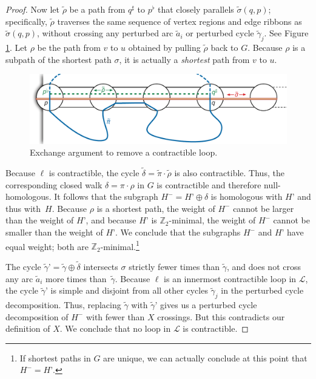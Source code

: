 \documentclass[letterpaper,review]{siamart190516}
\def\Z{\mathbb{Z}}
\begin{document}
\begin{proof}
Now let $\tilde\rho$ be a path from $q^\sharp$ to $p^\flat$ that closely parallels $\tilde\sigma(q,p)$; specifically, $\tilde\rho$ traverses the same sequence of vertex regions and edge ribbons as $\tilde\sigma(q,p)$, without crossing any perturbed arc $\tilde{a}_i$ or perturbed cycle $\tilde\gamma_j$.  See Figure \ref{F:contractible-exchange}.  Let $\rho$ be the path from $v$ to $u$ obtained by pulling $\tilde\rho$ back to $G$.  Because $\rho$ is a subpath of the shortest path $\sigma$, it is actually a \emph{shortest} path from $v$ to $u$.

\begin{figure}[ht]
\centering
\includegraphics[scale=0.4]{Fig/contractible-exchange}
\caption{Exchange argument to remove a contractible loop.}
\label{F:contractible-exchange}
\end{figure}

Because $\ell$ is contractible, the cycle $\tilde\delta = \tilde\pi\cdot\tilde\rho$ is also contractible.  Thus, the corresponding closed walk $\delta = \pi\cdot\rho$ in $G$ is contractible and therefore null-homologous.  It follows that the subgraph $H^- = H’\oplus \delta$ is homologous with $H’$ and thus with~$H$.  Because $\rho$ is a shortest path, the weight of $H^-$ cannot be larger than the weight of $H’$, and because $H’$ is $\Z_2$-minimal, the weight of $H^-$ cannot be smaller than the weight of $H’$.  We conclude that the subgraphs $H^-$ and $H’$ have equal weight; both are $\Z_2$-minimal.\footnote{If shortest paths in $G$ are unique, we can actually conclude at this point that $H^- = H’$.}

The cycle $\tilde\gamma’ = \tilde\gamma \oplus \tilde\delta$ intersects $\sigma$ strictly fewer times than $\tilde\gamma$, and does not cross any arc $\tilde{a}_i$ more times than~$\tilde\gamma$.  Because $\ell$ is an innermost contractible loop in $\mathcal{L}$, the cycle $\tilde\gamma’$ is simple and disjoint from all other cycles $\tilde\gamma_j$ in the perturbed cycle decomposition.  Thus, replacing $\tilde\gamma$ with $\tilde\gamma’$ gives us a perturbed cycle decomposition of $H^-$ with fewer than $X$ crossings.  But this contradicts our definition of $X$.  We conclude that no loop in $\mathcal{L}$ is contractible.


\end{proof}
\end{document}
